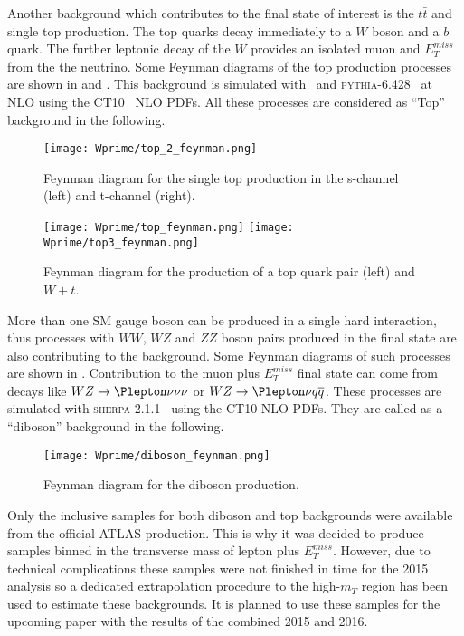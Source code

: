 Another background which contributes to the final state of interest is the $t\bar{t}$ and single top production.
The top quarks decay immediately to a $W$ boson and a $b$ quark. The further leptonic decay of the $W$ provides an isolated muon and $E_T^{miss}$ from the the neutrino.
Some Feynman diagrams of the top production processes are shown in  and .
This background is simulated with \powhegbox\ and {\scshape pythia-6.428}~\cite{Pythia} at NLO using the CT10~\cite{CT10} NLO PDFs.
All these processes are considered as ``Top'' background in the following.

\begin{figure}[!htb]
  \centering
  \texttt{[image: Wprime/top\_2\_feynman.png]}
  \caption{Feynman diagram for the single top production in the s-channel (left) and t-channel (right).}
  \label{fig:single_top_feynman}
\end{figure}

\begin{figure}[!htb]
  \centering
  \texttt{[image: Wprime/top\_feynman.png]}
  \texttt{[image: Wprime/top3\_feynman.png]}
  \caption{Feynman diagram for the production of a top quark pair (left) and $W + t$.}
  \label{fig:top_feynman}
\end{figure}

More than one SM gauge boson can be produced in a single hard interaction, thus processes with $WW$, $WZ$ and $ZZ$ boson pairs produced in the final state are also contributing to the background.
Some Feynman diagrams of such processes are shown in .
Contribution to the muon plus $E_T^{miss}$ final state can come from decays like $WZ \to \Plepton \nu \nu \nu$ or $WZ \to \Plepton \nu q \overline{q}$.
These processes are simulated with {\scshape sherpa-2.1.1}~\cite{Sherpa} using the CT10 NLO PDFs.
They are called as a ``diboson'' background in the following. 

\begin{figure}[!htb]
  \centering
  \texttt{[image: Wprime/diboson\_feynman.png]}
  \caption{Feynman diagram for the diboson production.}
  \label{fig:diboson_feynman}
\end{figure}

Only the inclusive samples for both diboson and top backgrounds were available from the official ATLAS production. 
This is why it was decided to produce samples binned in the transverse mass of lepton plus $E_T^{miss}$.
However, due to technical complications these samples were not finished in time for the 2015 analysis 
so a dedicated extrapolation procedure to the high-$m_T$ region has been used to estimate these backgrounds.
It is planned to use these samples for the upcoming paper with the results of the combined 2015 and 2016.

